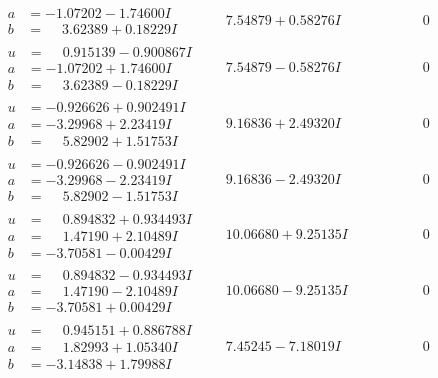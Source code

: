 \documentclass[1p]{elsarticle_modified}
\theoremstyle{definition}
\begin{document}
$$\begin{array}{c|c|c}
\begin{aligned}
a &= -1.07202 - 1.74600 I \\
b &= \phantom{-}3.62389 + 0.18229 I\end{aligned}
 & \phantom{-}7.54879 + 0.58276 I & \phantom{-0.000000 } 0 \\ \hline\begin{aligned}
u &= \phantom{-}0.915139 - 0.900867 I \\
a &= -1.07202 + 1.74600 I \\
b &= \phantom{-}3.62389 - 0.18229 I\end{aligned}
 & \phantom{-}7.54879 - 0.58276 I & \phantom{-0.000000 } 0 \\ \hline\begin{aligned}
u &= -0.926626 + 0.902491 I \\
a &= -3.29968 + 2.23419 I \\
b &= \phantom{-}5.82902 + 1.51753 I\end{aligned}
 & \phantom{-}9.16836 + 2.49320 I & \phantom{-0.000000 } 0 \\ \hline\begin{aligned}
u &= -0.926626 - 0.902491 I \\
a &= -3.29968 - 2.23419 I \\
b &= \phantom{-}5.82902 - 1.51753 I\end{aligned}
 & \phantom{-}9.16836 - 2.49320 I & \phantom{-0.000000 } 0 \\ \hline\begin{aligned}
u &= \phantom{-}0.894832 + 0.934493 I \\
a &= \phantom{-}1.47190 + 2.10489 I \\
b &= -3.70581 - 0.00429 I\end{aligned}
 & \phantom{-}10.06680 + 9.25135 I & \phantom{-0.000000 } 0 \\ \hline\begin{aligned}
u &= \phantom{-}0.894832 - 0.934493 I \\
a &= \phantom{-}1.47190 - 2.10489 I \\
b &= -3.70581 + 0.00429 I\end{aligned}
 & \phantom{-}10.06680 - 9.25135 I & \phantom{-0.000000 } 0 \\ \hline\begin{aligned}
u &= \phantom{-}0.945151 + 0.886788 I \\
a &= \phantom{-}1.82993 + 1.05340 I \\
b &= -3.14838 + 1.79988 I\end{aligned}
 & \phantom{-}7.45245 - 7.18019 I & \phantom{-0.000000 } 0\\

\end{array}$$
\end{document}
